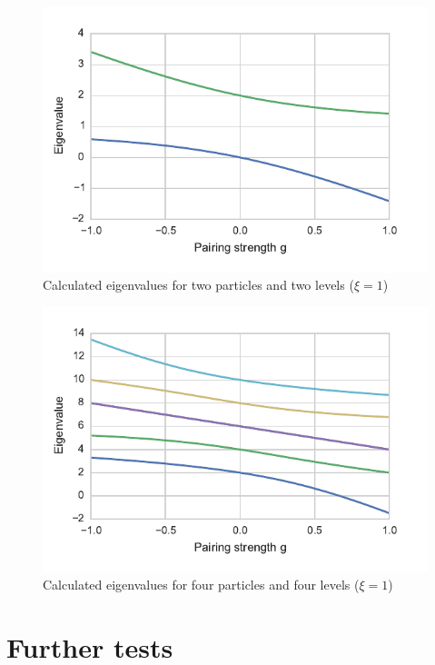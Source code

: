 \documentclass{article}
\begin{document}
	\begin{figure}[p]
		\centering
		\includegraphics{calc2.pdf}
		\caption{Calculated eigenvalues for two particles and two levels ($\xi=1$)}
		\label{fig:2lev_calc}
	\end{figure}

	\begin{figure}[p]
		\centering
		\includegraphics{calc4.pdf}
		\caption{Calculated eigenvalues for four particles and four levels ($\xi=1$)}
		\label{fig:4lev_calc}
	\end{figure}

\section{Further tests}
\end{document}

